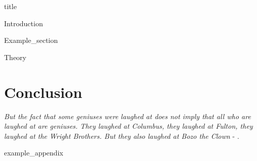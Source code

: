 \documentclass{article}
\begin{document}


{title}

\frontmatter

\tableofcontents

\listoffigures
\listoftables

\mainmatter

{Introduction}

{Example_section}

{Theory}

\section{Conclusion}
\textit{But the fact that some geniuses were laughed at does not imply that all who are laughed at are geniuses. They laughed at Columbus, they laughed at Fulton, they laughed at the Wright Brothers. But they also laughed at Bozo the Clown} -  \textcite{sagan_1993}.

\newpage
\printbibliography[heading = bibintoc, title = Bibliography]    %

\addappendix
{example_appendix}

\end{document}
